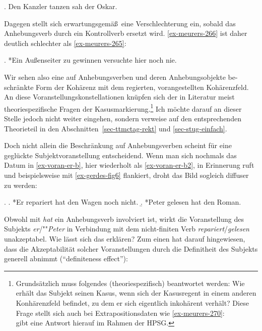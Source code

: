 \ex. Den Kanzler tanzen sah der Oskar. \hfill \citep[(275)]{Meurers:99}\label{ex-meurers-275}

Dagegen stellt sich erwartungsgemä\ss\ eine Verschlechterung ein, sobald das Anhebungsverb durch ein Kontrollverb ersetzt wird. \ref{ex-meurers-266} ist daher deutlich schlechter als \ref{ex-meurers-265}: 

\ex. *Ein Au\ss enseiter zu gewinnen versuchte hier noch nie.\hfill\citep[(266)]{Meurers:99}\label{ex-meurers-266}

Wir sehen also eine auf Anhebungsverben und deren Anhebungsobjekte be-\linebreak schränkte Form der Kohärenz mit dem regierten, vorangestellten Kohärenzfeld. An diese Voranstellungskonstellationen knüpfen sich der in Literatur meist theoriespezifische Fragen der Kasusmarkierung.\footnote{Grundsätzlich muss folgendes (theoriespezifisch) beantwortet werden: Wie erhält das Subjekt seinen Kasus, wenn sich der Kasusregent in einem anderen Konhärenzfeld befindet, zu dem er sich eigentlich inkohärent verhält? Diese Frage stellt sich auch bei Extrapositionsdaten wie \ref{ex-meurers-270}:\\
\citet[316ff]{Meurers:99} gibt eine Antwort hierauf im Rahmen der HPSG.} Ich möchte darauf an dieser Stelle jedoch nicht weiter eingehen, sondern verweise auf den entsprechenden Theorieteil in den Abschnitten~\ref{sec-ttmctag-rekt} und \ref{sec-stug-einfach}.

Doch nicht allein die Beschränkung auf Anhebungsverben scheint für eine geglückte Subjektvoranstellung entscheidend. Wenn man sich nochmals das Datum in \ref{ex-voran-er-b}, hier wiederholt als \ref{ex-voran-er-b2}, in Erinnerung ruft und beispielsweise mit \ref{ex-gerdes-fig6} flankiert, droht das Bild sogleich diffuser zu werden: 

\ex. 
\a. *Er repariert hat den Wagen noch nicht.\label{ex-voran-er-b2} 
\b. *Peter gelesen hat den Roman. \hfill \citep[Abbildung~6]{Gerdes:04}\label{ex-gerdes-fig6} 

Obwohl mit {\it hat} ein Anhebungsverb involviert ist, wirkt die Voranstellung des Subjekts {\it er}/""{\it Peter} in Verbindung mit dem nicht-finiten Verb {\it repariert}/{\it gelesen} unakzeptabel. Wie lässt sich das erklären? Zum einen hat \cite{Haider:90} darauf hingewiesen, dass die Akzeptabilität solcher Voranstellungen durch die Definitheit des Subjekts generell abnimmt ("`definiteness effect"'):   

